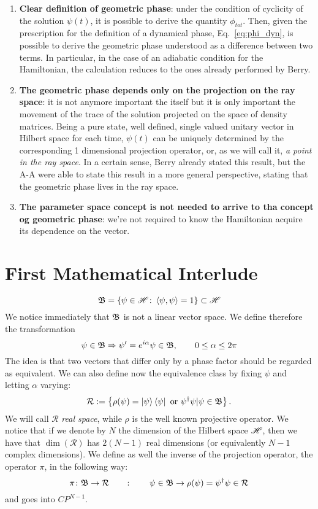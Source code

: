 \begin{enumerate}
	\item \textbf{Clear definition of geometric phase}: under the condition of cyclicity of the solution $ \psi(t) $, it is possible to derive the quantity $ \phi_{tot} $. Then, given the prescription for the definition of a dynamical phase, Eq.~\eqref{eq:phi_dyn}, is possible to derive the geometric phase understood as a difference between two terms.
	In particular, in the case of an adiabatic condition for the Hamiltonian, the calculation reduces to the ones already performed by Berry.
	\item \textbf{The geometric phase depends only on the projection on the ray space}: it is not anymore important the \wf itself but it is only important the movement of the trace of the solution projected on the space of density matrices. Being a pure state, well defined, single valued unitary vector in Hilbert space for each time, $ \psi(t) $ can be uniquely determined by the corresponding 1 dimensional projection operator, or, as we will call it, \emph{a point in the ray space}. In a certain sense, Berry already stated this result, but the A-A were able to state this result in a more general perspective, stating that the geometric phase lives in the ray space.
	\item \textbf{The parameter space concept is not needed to arrive to tha concept og geometric phase}: we're not required to know the Hamiltonian acquire its dependence on the \rp vector. 
\end{enumerate}
\section{First Mathematical Interlude}
\begin{equation}
\mathfrak{B}=\left\{\psi\in\mathscr{H}\colon \Braket{\psi,\psi}=1\right\}\subset\mathscr{H}
\end{equation}
We notice immediately that $ \mathfrak{B} $ is not a linear vector space. We define therefore the transformation
\begin{equation}
\psi\in\mathfrak{B}\Rightarrow \psi'=e^{i\alpha}\psi\in\mathfrak{B},\qquad 0\leq\alpha\leq 2\pi
\end{equation}
The idea is that two vectors that differ only by a phase factor should be regarded as equivalent. We can also define now the equivalence class by fixing $ \psi $ and letting $ \alpha $ varying:
\begin{equation}
\mathcal{R}:=\left\{\rho(\psi)=\Ket{\psi}\Bra{\psi} \text{ or } \psi^{\dagger}\psi | \psi\in\mathfrak{B} \right\}.
\end{equation}
We will call $ \mathcal{R} $ \textit{real space}, while $ \rho $ is the well known projective operator. We notice that if we denote by $ N $ the dimension of the Hilbert space $ \mathscr{H} $, then we have that $ \dim(\mathcal{R}) $ has $ 2(N-1) $ real dimensions (or equivalently $ N-1 $ complex dimensions).
We define as well the inverse of the projection operator, the operator $ \pi $, in the following way:
\begin{equation}
\pi\colon \mathfrak{B}\to\mathcal{R} \qquad \colon \qquad \psi\in\mathfrak{B}\rightarrow \rho(\psi)=\psi^{\dagger}\psi\in\mathcal{R}
\end{equation}
and goes into $ CP^{N-1} $.

